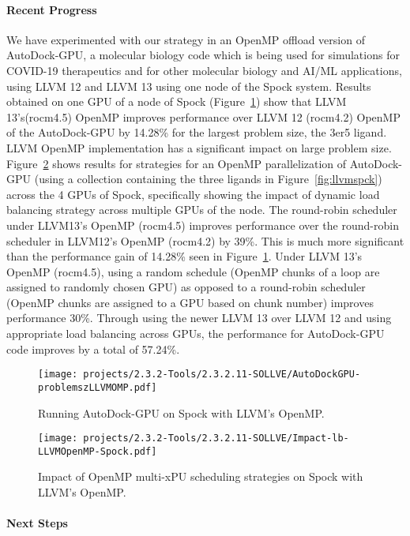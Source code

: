 \paragraph{Recent Progress} 

We have experimented with our strategy in an OpenMP offload version of AutoDock-GPU, a molecular biology code which is being used for simulations for COVID-19 therapeutics and for other molecular biology and AI/ML applications, using LLVM 12 and LLVM 13 using one node of the Spock system. Results obtained on one GPU of a node of Spock (Figure~\ref{fig:llvmadspck}) show that LLVM 13’s(rocm4.5) OpenMP improves performance over LLVM 12 (rocm4.2) OpenMP of the AutoDock-GPU by 14.28\% for the largest problem size, the 3er5 ligand. LLVM OpenMP implementation has a significant impact on large problem size. Figure~\ref{fig:mgpuSpock} shows results for strategies for an OpenMP parallelization of AutoDock-GPU (using a collection containing the three ligands in Figure~\ref{fig:llvmspck}) across the 4 GPUs of Spock, specifically showing the impact of dynamic load balancing strategy across multiple GPUs of the node. The round-robin scheduler under LLVM13’s OpenMP (rocm4.5) improves performance over the round-robin scheduler in LLVM12’s OpenMP (rocm4.2) by 39\%. This is much more significant than the performance gain of 14.28\% seen in Figure~\ref{fig:llvmadspck}.  Under LLVM 13’s OpenMP (rocm4.5), using a random schedule (OpenMP chunks of a loop are assigned to randomly chosen GPU) as opposed to a round-robin scheduler (OpenMP chunks are assigned to a GPU based on chunk number) improves performance 30\%. Through using the newer LLVM 13 over LLVM 12 and using appropriate load balancing across GPUs, the performance for AutoDock-GPU code improves by a total of 57.24\%.  


\begin{figure}[h!]
    \centering
    \texttt{[image: projects/2.3.2-Tools/2.3.2.11-SOLLVE/AutoDockGPU-problemszLLVMOMP.pdf]}
    \caption{Running AutoDock-GPU on Spock with LLVM's OpenMP.}
    \label{fig:llvmadspck}
\end{figure}\begin{figure}[h!]
    \centering
    \texttt{[image: projects/2.3.2-Tools/2.3.2.11-SOLLVE/Impact-lb-LLVMOpenMP-Spock.pdf]}
    \caption{Impact of OpenMP multi-xPU scheduling strategies on Spock with LLVM's OpenMP.}
    \label{fig:mgpuSpock}
\end{figure}

\paragraph{Next Steps}

